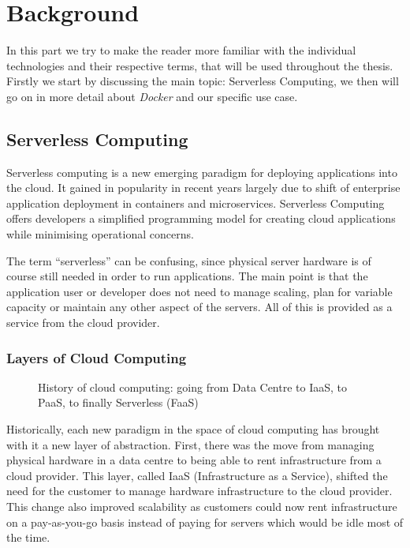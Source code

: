 \section{Background}

In this part we try to make the reader more familiar with the individual technologies and their
respective terms, that will be used throughout the thesis. Firstly we start by discussing the main
topic: Serverless Computing, we then will go on in more detail about \textit{Docker} and our
specific use case.

\subsection{Serverless Computing}

Serverless computing is a new emerging paradigm for deploying applications into the cloud. It gained
in popularity in recent years largely due to shift of enterprise application deployment in
containers and microservices. Serverless Computing offers developers a simplified programming model
for creating cloud applications while minimising operational concerns. \cite{servprog}

The term “serverless” can be confusing, since physical server hardware is of course still needed in
order to run applications. The main point is that the application user or developer does not need to
manage scaling, plan for variable capacity or maintain any other aspect of the servers. All of this
is provided as a service from the cloud provider. \cite{wikiservcomp}

\subsubsection{Layers of Cloud Computing}

\begin{figure}[H]
  \centering
  \caption{History of cloud computing: going from Data Centre to IaaS, to PaaS, to finally
  Serverless (FaaS) \cite{layercloudcomp}}
\end{figure}

Historically, each new paradigm in the space of cloud computing has brought with it a new layer of
abstraction. First, there was the move from managing physical hardware in a data centre to being
able to rent infrastructure from a cloud provider. This layer, called IaaS (Infrastructure as a
Service), shifted the need for the customer to manage hardware infrastructure to the cloud provider.
This change also improved scalability as customers could now rent infrastructure on a pay-as-you-go
basis instead of paying for servers which would be idle most of the time.

